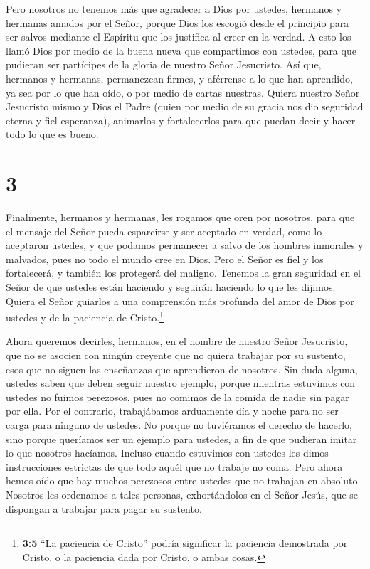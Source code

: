  Pero nosotros no tenemos más que agradecer a Dios por
ustedes, hermanos y hermanas amados por el Señor, porque Dios los
escogió desde el principio para ser salvos mediante el Espíritu que los
justifica al creer en la verdad.  A esto los llamó Dios por
medio de la buena nueva que compartimos con ustedes, para que pudieran
ser partícipes de la gloria de nuestro Señor Jesucristo. 
Así que, hermanos y hermanas, permanezcan firmes, y aférrense a lo que
han aprendido, ya sea por lo que han oído, o por medio de cartas
nuestras.  Quiera nuestro Señor Jesucristo mismo y Dios el
Padre (quien por medio de su gracia nos dio seguridad eterna y fiel
esperanza),  animarlos y fortalecerlos para que puedan
decir y hacer todo lo que es bueno.

\hypertarget{section-2}{%
\section{3}\label{section-2}}

 Finalmente, hermanos y hermanas, les rogamos que oren por
nosotros, para que el mensaje del Señor pueda esparcirse y ser aceptado
en verdad, como lo aceptaron ustedes,  y que podamos
permanecer a salvo de los hombres inmorales y malvados, pues no todo el
mundo cree en Dios.  Pero el Señor es fiel y los
fortalecerá, y también los protegerá del maligno.  Tenemos
la gran seguridad en el Señor de que ustedes están haciendo y seguirán
haciendo lo que les dijimos.  Quiera el Señor guiarlos a una
comprensión más profunda del amor de Dios por ustedes y de la paciencia
de Cristo.\footnote{\textbf{3:5} ``La paciencia de Cristo'' podría
  significar la paciencia demostrada por Cristo, o la paciencia dada por
  Cristo, o ambas cosas.}

 Ahora queremos decirles, hermanos, en el nombre de nuestro
Señor Jesucristo, que no se asocien con ningún creyente que no quiera
trabajar por su sustento, esos que no siguen las enseñanzas que
aprendieron de nosotros.  Sin duda alguna, ustedes saben que
deben seguir nuestro ejemplo, porque mientras estuvimos con ustedes no
fuimos perezosos,  pues no comimos de la comida de nadie sin
pagar por ella. Por el contrario, trabajábamos arduamente día y noche
para no ser carga para ninguno de ustedes.  No porque no
tuviéramos el derecho de hacerlo, sino porque queríamos ser un ejemplo
para ustedes, a fin de que pudieran imitar lo que nosotros hacíamos.
 Incluso cuando estuvimos con ustedes les dimos
instrucciones estrictas de que todo aquél que no trabaje no coma.
 Pero ahora hemos oído que hay muchos perezosos entre
ustedes que no trabajan en absoluto.  Nosotros les
ordenamos a tales personas, exhortándolos en el Señor Jesús, que se
dispongan a trabajar para pagar su sustento.

